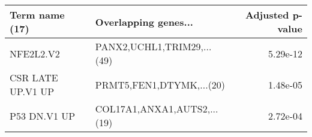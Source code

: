 \begin{tabular}{llr}
\toprule
   Term name (17) &        Overlapping genes... &  Adjusted p-value \\
\midrule
        NFE2L2.V2 &  PANX2,UCHL1,TRIM29,...(49) &          5.29e-12 \\
CSR LATE UP.V1 UP &    PRMT5,FEN1,DTYMK,...(20) &          1.48e-05 \\
     P53 DN.V1 UP & COL17A1,ANXA1,AUTS2,...(19) &          2.72e-04 \\
\bottomrule
\end{tabular}
